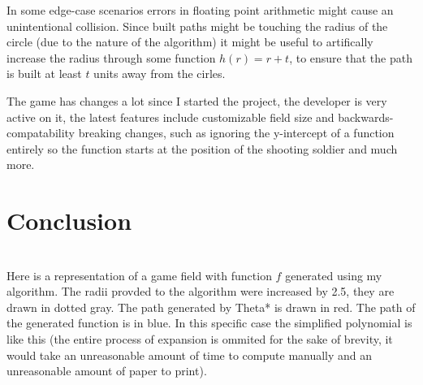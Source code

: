 \documentclass[12pt, titlepage]{article}
\begin{document}
In some edge-case scenarios errors in floating point arithmetic might 
cause an unintentional collision. Since built paths might be touching 
the radius of the circle (due to the nature of the algorithm) it might be
useful to artifically increase the radius through some function $h(r) = r + t$,
to ensure that the path is built at least $t$ units away from the cirles.

The game has changes a lot since I started the project, the developer 
is very active on it, the latest features include customizable 
field size and backwards-compatability breaking changes, such as ignoring the 
y-intercept of a function entirely so the function starts at the position
of the shooting soldier and much more.

\section{Conclusion}

\begin{center}
\\
Here is a representation of a game field with function $f$ generated using my
algorithm. The radii provded to the algorithm were increased by 2.5,
they are drawn in dotted gray. The path generated by Theta* is drawn in red.
The path of the generated function is in blue. In this specific case
the simplified polynomial is like this (the entire process of expansion
is ommited for the sake of brevity, it  would take an unreasonable amount 
of time to compute manually and an unreasonable amount of paper to print).
\end{center}
\end{document}
